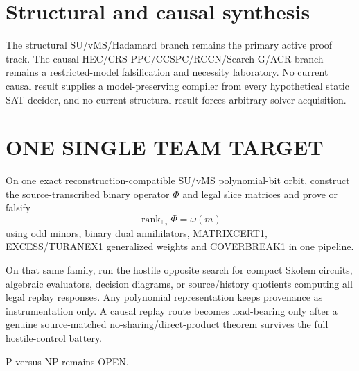 \documentclass[11pt]{article}
\begin{document}
\section*{Structural and causal synthesis}
The structural SU/vMS/Hadamard branch remains the primary active proof track. The causal HEC/CRS-PPC/CCSPC/RCCN/Search-G/ACR branch remains a restricted-model falsification and necessity laboratory. No current causal result supplies a model-preserving compiler from every hypothetical static SAT decider, and no current structural result forces arbitrary solver acquisition.

\section*{ONE SINGLE TEAM TARGET}
On one exact reconstruction-compatible SU/vMS polynomial-bit orbit, construct the source-transcribed binary operator \(\Phi\) and legal slice matrices and prove or falsify
\[
\boxed{\operatorname{rank}_{\mathbb F_2}\Phi=\omega(m)}
\]
using odd minors, binary dual annihilators, MATRIXCERT1, EXCESS/TURANEX1 generalized weights and COVERBREAK1 in one pipeline.

On that same family, run the hostile opposite search for compact Skolem circuits, algebraic evaluators, decision diagrams, or source/history quotients computing all legal replay responses. Any polynomial representation keeps provenance as instrumentation only. A causal replay route becomes load-bearing only after a genuine source-matched no-sharing/direct-product theorem survives the full hostile-control battery.

P versus NP remains OPEN.
\end{document}
